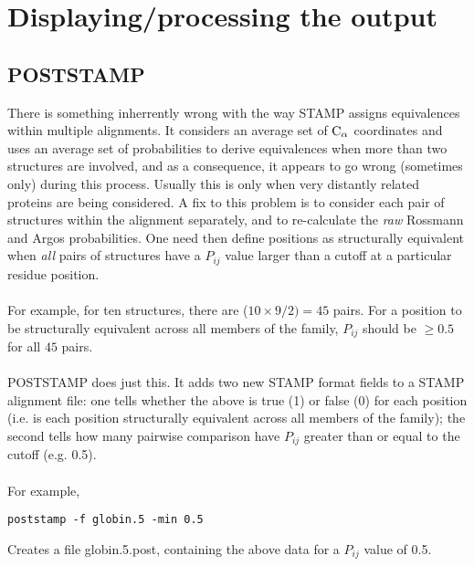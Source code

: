 \section{Displaying/processing the output}

\subsection{POSTSTAMP}

There is something inherrently wrong with the way STAMP assigns 
equivalences within multiple alignments.  It considers an average set of 
${\rm C}_{\alpha}$ coordinates and uses an average set of probabilities to derive 
equivalences when more than two structures are involved, and as a 
consequence, it appears to go wrong (sometimes only) during this process.  
Usually this is only when very distantly related proteins are being 
considered.  A fix to this problem is to consider each pair of structures 
within the alignment separately, and to re-calculate the {\em raw} 
Rossmann and Argos probabilities.  One need then define positions as 
structurally equivalent when {\em all} pairs of structures have a 
$P_{ij}$ value larger than a cutoff at a particular residue position.\\
\\
For example, for ten structures, there are ($10 \times 9/2) = 45$ pairs.  
For a position to be structurally equivalent across all members of the 
family, $P_{ij}$ should be $ \geq 0.5$ for all $45$ pairs.  \\
\\
POSTSTAMP does just this.  It adds two new STAMP format fields to a STAMP
alignment file: one tells 
whether the above is true (1) or false (0) for each position (i.e. is 
each position structurally equivalent across all members of the family); 
the second tells how many pairwise comparison have $P_{ij}$ greater than 
or equal to the cutoff (e.g. 0.5).\\
\\
For example, \\

\begin{scriptsize}\begin{verbatim}
poststamp -f globin.5 -min 0.5
\end{verbatim} \end{scriptsize}

Creates a file globin.5.post, containing the above data for a $P_{ij}$ 
value of 0.5.\\

